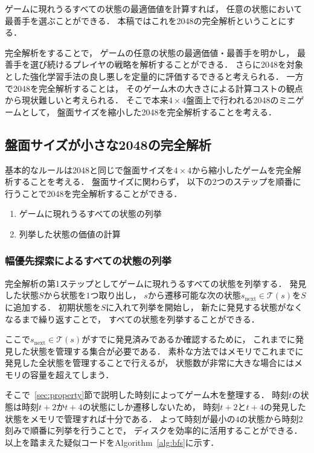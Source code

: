 ゲームに現れうるすべての状態の最適価値を計算すれば， 任意の状態において最善手を選ぶことができる．
本稿ではこれを2048の完全解析ということにする．

完全解析をすることで， ゲームの任意の状態の最適価値・最善手を明かし， 最善手を選び続けるプレイヤの戦略を解析することができる．
さらに2048を対象とした強化学習手法の良し悪しを定量的に評価するできると考えられる．
一方で2048を完全解析することは， そのゲーム木の大きさによる計算コストの観点から現状難しいと考えられる．
そこで本来$4\times4$盤面上で行われる2048のミニゲームとして， 盤面サイズを縮小した2048を完全解析することを考える．

\subsection{盤面サイズが小さな2048の完全解析}
\label{sec:mini2048}
基本的なルールは2048と同じで盤面サイズを$4\times4$から縮小したゲームを完全解析することを考える．
盤面サイズに関わらず， 以下の$2$つのステップを順番に行うことで2048を完全解析することができる．

\begin{enumerate}
    \item ゲームに現れうるすべての状態の列挙
    \item 列挙した状態の価値の計算
\end{enumerate}

\subsubsection{幅優先探索によるすべての状態の列挙}
\label{subsec:enumeration}
完全解析の第1ステップとしてゲームに現れうるすべての状態を列挙する．
発見した状態$S$から状態を$1$つ取り出し， $s$から遷移可能な次の状態$s_{\text{next}} \in \mathcal{T}(s)$を$S$に追加する．
初期状態を$S$に入れて列挙を開始し， 新たに発見する状態がなくなるまで繰り返すことで， すべての状態を列挙することができる．

ここで$s_{\text{next}} \in \mathcal{T}(s)$がすでに発見済みであるか確認するために， これまでに発見した状態を管理する集合が必要である．
素朴な方法ではメモリでこれまでに発見した全状態を管理することで行えるが， 状態数が非常に大きな場合にはメモリの容量を超えてしまう．

そこで~\ref{sec:property}節で説明した時刻によってゲーム木を整理する．
時刻$t$の状態は時刻$t+2$か$t+4$の状態にしか遷移しないため， 時刻$t+2$と$t+4$の発見した状態をメモリで管理すれば十分である．
よって時刻が最小の$4$の状態から時刻$2$刻みで順番に列挙を行うことで， ディスクを効率的に活用することができる．
以上を踏まえた疑似コードをAlgorithm~\ref{alg:bfs}に示す．

